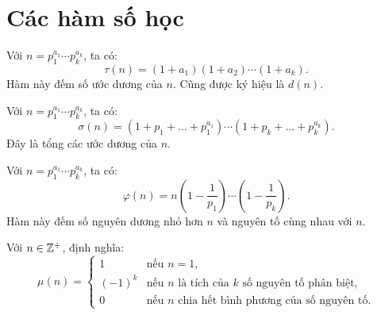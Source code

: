 \documentclass[../imo-training-open-book.tex]{subfiles}
\begin{document}
\newpage

\section{Các hàm số học}

\begin{definition}
    \label{definition:tau-function}
    Với \( n = p_1^{a_1} \cdots p_k^{a_k} \), ta có:
    \[
        \tau(n) = (1 + a_1)(1 + a_2) \cdots (1 + a_k).
    \]
    Hàm này đếm số ước dương của \( n \). Cũng được ký hiệu là \( d(n) \).
\end{definition}

\vspace{1em}

\begin{definition}
    \label{definition:sigma-function}
    Với \( n = p_1^{a_1} \cdots p_k^{a_k} \), ta có:
    \[
        \sigma(n) = \left(1 + p_1 + \dots + p_1^{a_1}\right) \cdots \left(1 + p_k + \dots + p_k^{a_k}\right).
    \]
    Đây là tổng các ước dương của \( n \).
\end{definition}

\vspace{1em}

\begin{definition}
    \label{definition:euler-totient}
    Với \( n = p_1^{a_1} \cdots p_k^{a_k} \), ta có:
    \[
        \varphi(n) = n\left(1 - \frac{1}{p_1}\right) \cdots \left(1 - \frac{1}{p_k}\right).
    \]
    Hàm này đếm số nguyên dương nhỏ hơn \( n \) và nguyên tố cùng nhau với \( n \).
\end{definition}

\vspace{1em}

\begin{definition}
    \label{definition:mobius-function}
    Với \( n \in \mathbb Z^+ \), định nghĩa:
    \[
        \mu(n) =
        \begin{cases}
            1 & \text{nếu } n = 1, \\
            (-1)^k & \text{nếu } n \text{ là tích của } k \text{ số nguyên tố phân biệt}, \\
            0 & \text{nếu } n \text{ chia hết bình phương của số nguyên tố}.
        \end{cases}
    \]
\end{definition}
\end{document}
